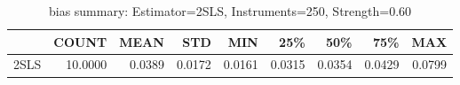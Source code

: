 \begin{table}[ht]
\centering
\caption{bias summary: Estimator=2SLS, Instruments=250, Strength=0.60}
\begin{tabular}{lrrrrrrrr}
\toprule
 & COUNT & MEAN & STD & MIN & 25\% & 50\% & 75\% & MAX \\
\midrule
2SLS & 10.0000 & 0.0389 & 0.0172 & 0.0161 & 0.0315 & 0.0354 & 0.0429 & 0.0799 \\
\bottomrule
\end{tabular}
\end{table}
